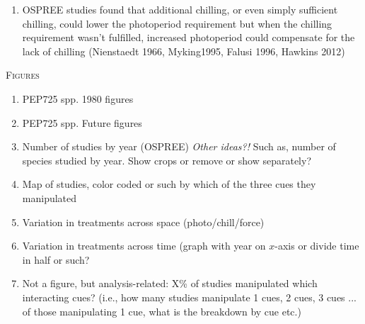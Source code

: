 \documentclass[11pt,letterpaper]{article}
\renewcommand{\section}[1]{%
\bigskip
\begin{center}
\begin{Large}
\normalfont\scshape #1
\medskip
\end{Large}
\end{center}}
\begin{document}
\begin{enumerate}
\item OSPREE studies found that additional chilling, or even simply sufficient 	chilling, could lower the photoperiod requirement but when the chilling requirement 	wasn’t fulfilled, increased photoperiod could compensate for the lack of chilling 	(Nienstaedt 1966, Myking1995, Falusi 1996, Hawkins 2012) 
\end{enumerate}


\newpage
\section{Figures}
\begin{enumerate}
\item PEP725 spp. 1980 figures
\item PEP725 spp. Future figures
\item Number of studies by year (OSPREE) \emph{Other ideas?!} Such as, number of species studied by year. Show crops or remove or show separately?
\item Map of studies, color coded or such by which of the three cues they manipulated
\item Variation in treatments across space (photo/chill/force)
\item Variation in treatments across time (graph with year on $x$-axis or divide time in half or such? 
\item Not a figure, but analysis-related: X\% of studies manipulated which interacting cues? (i.e., how many studies manipulate 1 cues, 2 cues, 3 cues ... of those manipulating 1 cue, what is the breakdown by cue etc.)
\end{enumerate}




\end{document}
